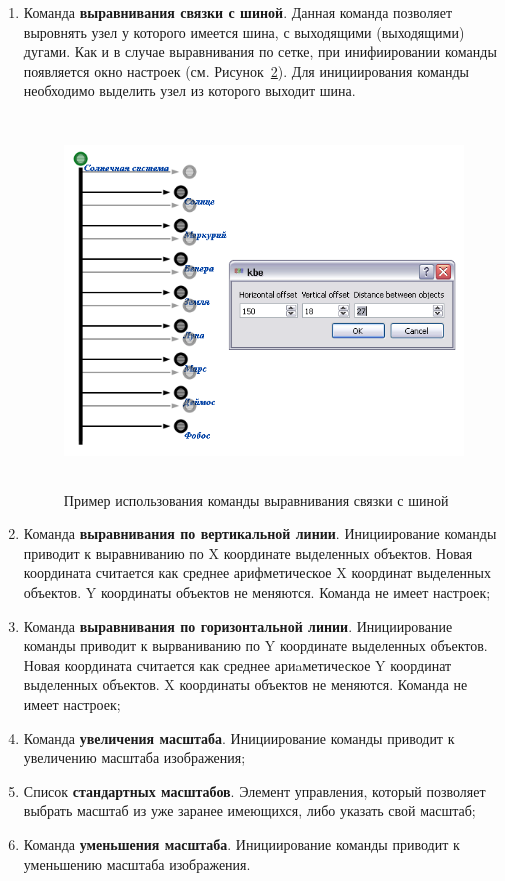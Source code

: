 \begin{enumerate}
\begin{figure}[h]
	\caption{Пример использования команды выравнивания по сетке}
	\label{gridaligment}
\end{figure}
В диалоговом окне, которое появляется после инициирования команды, можно установить желаемые размеры сетки (см. Рисунок~\ref{gridaligment}).
	\item Команда \textbf{выравнивания связки с шиной}. Данная команда позволяет выровнять узел у которого имеется шина, с выходящими (выходящими) дугами. Как и в случае выравнивания по сетке, при инифиировании команды появляется окно настроек (см. Рисунок~\ref{tuplealigment}). Для инициирования команды необходимо выделить узел из которого выходит шина.
	
\begin{figure}[h]
	\includegraphics[width=13.07cm, height=9.82cm]{../images/tuplealigment.png}
	\caption{Пример использования команды выравнивания связки с шиной}
	\label{tuplealigment}
\end{figure}
	\item Команда \textbf{выравнивания по вертикальной линии}. Инициирование команды приводит к выравниванию по X координате выделенных объектов. Новая координата считается как среднее арифметическое X координат выделенных объектов. Y координаты объектов не меняются. Команда не имеет настроек;
	\item Команда \textbf{выравнивания по горизонтальной линии}. Инициирование команды приводит к вырваниванию по Y координате выделенных объектов. Новая координата считается как среднее ариaметическое Y координат выделенных объектов. X координаты объектов не меняются. Команда не имеет настроек;
	\item Команда \textbf{увеличения масштаба}. Инициирование команды приводит к увеличению масштаба изображения;
	\item Список \textbf{стандартных масштабов}. Элемент управления, который позволяет выбрать масштаб из уже заранее имеющихся, либо указать свой масштаб;
	\item Команда \textbf{уменьшения масштаба}. Инициирование команды приводит к уменьшению масштаба изображения.
\end{enumerate}

